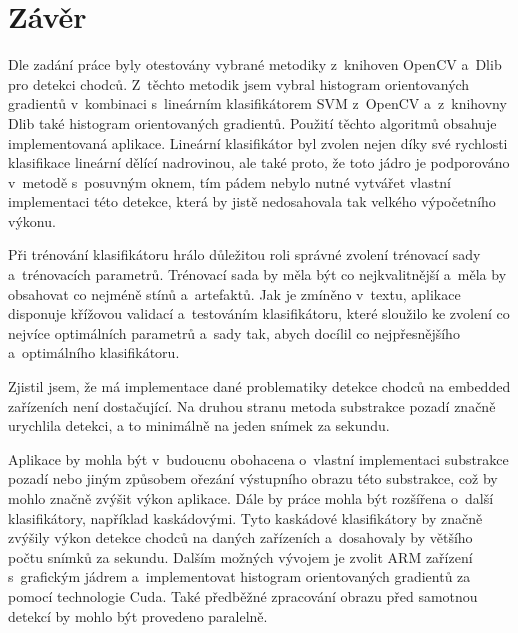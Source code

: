 \section{Závěr}
Dle zadání práce byly otestovány vybrané metodiky z~knihoven OpenCV a~Dlib pro detekci chodců. Z~těchto metodik jsem vybral histogram orientovaných gradientů v~kombinaci s~lineárním klasifikátorem SVM z~OpenCV a~z~knihovny Dlib také histogram orientovaných gradientů. Použití těchto algoritmů obsahuje implementovaná aplikace. Lineární klasifikátor byl zvolen nejen díky své rychlosti klasifikace lineární dělící nadrovinou, ale také proto, že toto jádro je podporováno v~metodě s~posuvným oknem, tím pádem nebylo nutné vytvářet vlastní implementaci této detekce, která by jistě nedosahovala tak velkého výpočetního výkonu. 

Při trénování klasifikátoru hrálo důležitou roli správné zvolení trénovací sady a~trénovacích parametrů. Trénovací sada by měla být co nejkvalitnější a~měla by obsahovat co nejméně stínů a~artefaktů. Jak je zmíněno v~textu, aplikace disponuje křížovou validací a~testováním klasifikátoru, které sloužilo ke zvolení co nejvíce optimálních parametrů a~sady tak, abych docílil co nejpřesnějšího a~optimálního klasifikátoru.

Zjistil jsem, že má implementace dané problematiky detekce chodců na embedded zařízeních není dostačující. Na druhou stranu metoda substrakce pozadí značně urychlila detekci, a to minimálně na jeden snímek za sekundu.

Aplikace by mohla být v~budoucnu obohacena o~vlastní implementaci substrakce pozadí nebo jiným způsobem ořezání výstupního obrazu této substrakce, což by mohlo značně zvýšit výkon aplikace. Dále by práce mohla být rozšířena o~další klasifikátory, například kaskádovými. Tyto kaskádové klasifikátory by značně zvýšily výkon detekce chodců na daných zařízeních a~dosahovaly by většího počtu snímků za sekundu. Dalším možných vývojem je zvolit ARM zařízení s~grafickým jádrem a~implementovat histogram orientovaných gradientů za pomocí technologie Cuda. Také předběžné zpracování obrazu před samotnou detekcí by mohlo být provedeno paralelně.


